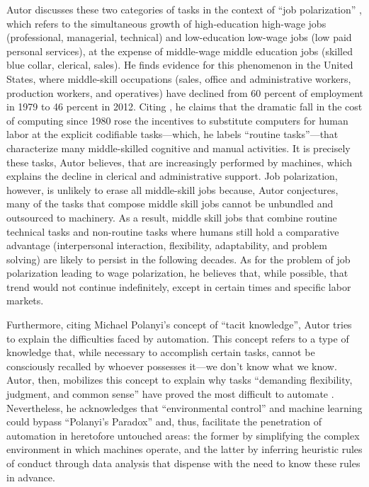 \documentclass[version=last,draft=false,paper=A4,portrait,twoside=true,twocolumn=false,headinclude=false,footinclude=false,mpinclude=true,fontsize=12,BCOR=20mm,DIV=calc,pagesize=auto,open=right,chapterprefix=true,numbers=autoendperiod,headsepline=false,headings=twolinechapter,parskip=false]{scrbook}
\begin{document}
Autor discusses these two categories of tasks in the context of ``job
polarization'' \autocite{goos_manning2003}, which refers to the simultaneous
growth of high-education high-wage jobs (professional, managerial,
technical) and low-education low-wage jobs (low paid personal services), at
the expense of middle-wage middle education jobs (skilled blue collar,
clerical, sales). He finds evidence for this phenomenon in the United
States, where middle-skill occupations (sales, office and administrative
workers, production workers, and operatives) have declined from 60 percent
of employment in 1979 to 46 percent in 2012. Citing \textcite{nordhaus2007},
he claims that the dramatic fall in the cost of computing since 1980 rose
the incentives to substitute computers for human labor at the explicit
codifiable tasks---which, he labels ``routine tasks''---that characterize
many middle-skilled cognitive and manual activities. It is precisely these
tasks, Autor believes, that are increasingly performed by machines, which
explains the decline in clerical and administrative support. Job
polarization, however, is unlikely to erase all middle-skill jobs because,
Autor conjectures, many of the tasks that compose middle skill jobs cannot
be unbundled and outsourced to machinery. As a result, middle skill jobs
that combine routine technical tasks and non-routine tasks where humans
still hold a comparative advantage (interpersonal interaction, flexibility,
adaptability, and problem solving) are likely to persist in the following
decades. As for the problem of job polarization leading to wage
polarization, he believes that, while possible, that trend would not
continue indefinitely, except in certain times and specific labor markets.

Furthermore, citing Michael Polanyi's concept of ``tacit knowledge'', Autor
tries to explain the difficulties faced by automation. This concept refers
to a type of knowledge that, while necessary to accomplish certain tasks,
cannot be consciously recalled by whoever possesses it---we don't know what
we know. Autor, then, mobilizes this concept to explain why tasks
``demanding flexibility, judgment, and common sense'' have proved the most
difficult to automate \autocite[11]{autor2015}. Nevertheless, he
acknowledges that ``environmental control'' and machine learning could
bypass ``Polanyi's Paradox'' and, thus, facilitate the penetration of
automation in heretofore untouched areas: the former by simplifying the
complex environment in which machines operate, and the latter by inferring
heuristic rules of conduct through data analysis that dispense with the
need to know these rules in advance.
\end{document}
